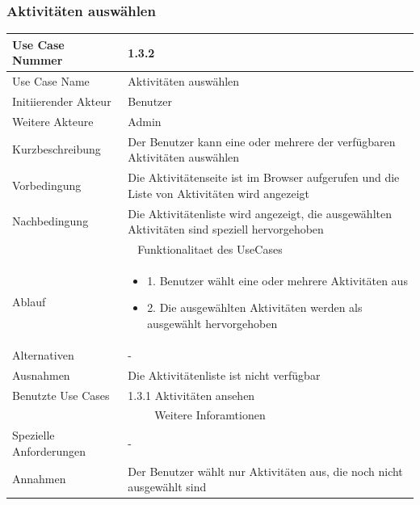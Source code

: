 \documentclass[10pt,a4paper]{article}
\begin{document}
	\subsubsection{Aktivit\"aten ausw\"ahlen}
	\begin{tabular}{|l|p{.5\linewidth}|}
	\hline Use Case Nummer & 1.3.2 \\ 
	\hline Use Case Name & Aktivit\"aten ausw\"ahlen \\ 
	\hline Initiierender Akteur & Benutzer \\
	\hline Weitere Akteure & Admin \\
	\hline Kurzbeschreibung & Der Benutzer kann eine oder mehrere der verf\"ugbaren Aktivit\"aten ausw\"ahlen \\
	\hline Vorbedingung & Die Aktivit\"atenseite ist im Browser aufgerufen und die Liste von Aktivit\"aten wird angezeigt \\
	\hline Nachbedingung & Die Aktivit\"atenliste wird angezeigt, die ausgew\"ahlten Aktivit\"aten sind speziell hervorgehoben \\
	\hline \multicolumn{2}{|c|}{Funktionalitaet des UseCases}\\
	\hline Ablauf & \begin{itemize}
			\item 1. Benutzer w\"ahlt eine oder mehrere Aktivit\"aten aus
			\item 2. Die ausgew\"ahlten Aktivit\"aten werden als ausgew\"ahlt hervorgehoben
		\end{itemize} \\
	\hline Alternativen & - \\
	\hline Ausnahmen & Die Aktivit\"atenliste ist nicht verf\"ugbar \\
	\hline Benutzte Use Cases & 1.3.1 Aktivit\"aten ansehen \\
	\hline \multicolumn{2}{|c|}{Weitere Inforamtionen} \\
	\hline Spezielle Anforderungen & - \\
	\hline Annahmen & Der Benutzer w\"ahlt nur Aktivit\"aten aus, die noch nicht ausgew\"ahlt sind \\
	\hline
	\end{tabular}
\end{document}
